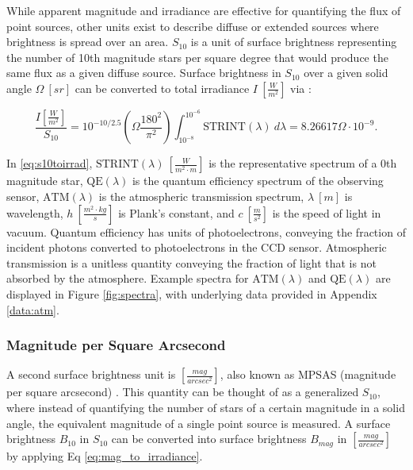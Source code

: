 While apparent magnitude and irradiance are effective for quantifying the flux of point sources, other units exist
to describe diffuse or extended sources where brightness is spread over an
area. $S_{10}$ is a unit of surface brightness representing the number of 10th magnitude stars per square degree that would produce the same flux as a given diffuse source.
Surface brightness in $S_{10}$ over a given solid angle $\Omega \: \left[ sr \right]$ can be converted to total irradiance $I \: \left[ \frac{W}{m^2} \right]$ via \cite{krag2003}:

\begin{equation} \label{eq:s10toirrad}
 \frac{I \left[ \frac{W}{m^2} \right]}{S_{10}} = 10^{-10/2.5} \left( \Omega \frac{180^2}{\pi^2} \right)
  \int_{10^{-8}}^{10^{-6}}{ \textrm{STRINT}(\lambda) \: d\lambda} = 8.26617 \Omega \cdot 10^{-9}.
\end{equation}

In \ref{eq:s10toirrad}, $\textrm{STRINT}(\lambda) \: \left[ \frac{W}{m^2 \cdot m} \right]$ is the
representative spectrum of a 0th magnitude star, $\textrm{QE}(\lambda)$ is the quantum efficiency
spectrum of the observing sensor, $\textrm{ATM}(\lambda)$ is the atmospheric transmission spectrum, $\lambda \: [m]$ is wavelength, $h \: \left[
\frac{m^2 \cdot kg}{s} \right]$ is Plank's constant, and $c \: \left[ \frac{m}{s^2} \right]$ is the
speed of light in vacuum. Quantum efficiency has units of photoelectrons, conveying the fraction of incident photons converted to photoelectrons in the CCD sensor. Atmospheric transmission is a unitless quantity conveying the fraction of light that is not absorbed by the atmosphere. Example spectra for $\textrm{ATM}(\lambda)$ and $\textrm{QE}(\lambda)$ are displayed in Figure \ref{fig:spectra}, with underlying data provided in Appendix \ref{data:atm}.

\subsubsection{Magnitude per Square Arcsecond}

A second surface brightness unit is $\left[ \frac{mag}{arcsec^2} \right]$, also known as MPSAS (magnitude per square arcsecond) \cite{krag2003}. This quantity can be thought of as a generalized $S_{10}$, where instead of quantifying the number of stars of a certain
magnitude in a solid angle, the equivalent magnitude of a single point source is measured. A surface
brightness $B_{10}$ in $S_{10}$ can be converted into surface brightness $B_{mag}$ in 
$\left[ \frac{mag}{arcsec^2} \right]$ by applying Eq \ref{eq:mag_to_irradiance}.


